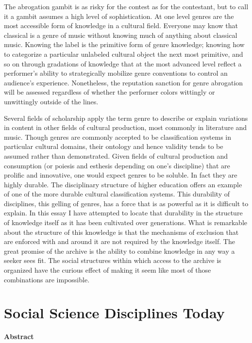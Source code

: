 \documentclass[]{book}
\theoremstyle{definition}
\theoremstyle{definition}
\theoremstyle{definition}
\theoremstyle{remark}
\begin{document}
The abrogation gambit is as risky for the contest as for the contestant,
but to call it a gambit assumes a high level of sophistication. At one
level genres are the most accessible form of knowledge in a cultural
field. Everyone may know that classical is a genre of music without
knowing much of anything about classical music. Knowing the label is the
primitive form of genre knowledge; knowing how to categorize a
particular unlabeled cultural object the next most primitive, and so on
through gradations of knowledge that at the most advanced level reflect
a performer's ability to strategically mobilize genre conventions to
control an audience's experience. Nonetheless, the reputation sanction
for genre abrogation will be assessed regardless of whether the
performer colors wittingly or unwittingly outside of the lines.

Several fields of scholarship apply the term genre to describe or
explain variations in content in other fields of cultural production,
most commonly in literature and music. Though genres are commonly
accepted to be classification systems in particular cultural domains,
their ontology and hence validity tends to be assumed rather than
demonstrated. Given fields of cultural production and consumption (or
poiesis and esthesis depending on one's discipline) that are prolific
and innovative, one would expect genres to be soluble. In fact they are
highly durable. The disciplinary structure of higher education offers an
example of one of the more durable cultural classification systems. This
durability of disciplines, this gelling of genres, has a force that is
as powerful as it is difficult to explain. In this essay I have
attempted to locate that durability in the structure of knowledge itself
as it has been cultivated over generations. What is remarkable about the
structure of this knowledge is that the mechanisms of exclusion that are
enforced with and around it are not required by the knowledge itself.
The great promise of the archive is the ability to combine knowledge in
any way a seeker sees fit. The social structures within which access to
the archive is organized have the curious effect of making it seem like
most of those combinations are impossible.

\hypertarget{dis}{%
\chapter{Social Science Disciplines Today}\label{dis}}

\hypertarget{abstract-1}{%
\subsubsection*{Abstract}\label{abstract-1}}
\end{document}
